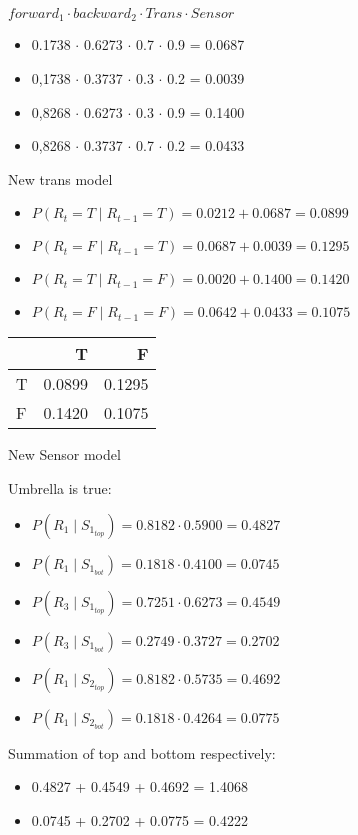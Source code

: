 \documentclass[colorlinks=true,linkcolor=blue]{article}
\begin{document}
$forward_1 \cdot backward_2 \cdot Trans \cdot Sensor$
\begin{itemize}
\item 0.1738 $\cdot$ 0.6273 $\cdot$ 0.7 $\cdot$ 0.9 = 0.0687
\item 0,1738 $\cdot$ 0.3737 $\cdot$ 0.3 $\cdot$ 0.2 = 0.0039
\item 0,8268 $\cdot$ 0.6273 $\cdot$ 0.3 $\cdot$ 0.9 = 0.1400
\item 0,8268 $\cdot$ 0.3737 $\cdot$ 0.7 $\cdot$ 0.2 = 0.0433
\end{itemize}

New trans model
\begin{itemize}
\item $P(R_t = T \mid R_{t-1} = T) = 0.0212 + 0.0687 = 0.0899$
\item $P(R_t = F \mid R_{t-1} = T) = 0.0687 + 0.0039 = 0.1295$
\item $P(R_t = T \mid R_{t-1} = F) = 0.0020 + 0.1400 = 0.1420$
\item $P(R_t = F \mid R_{t-1} = F) = 0.0642 + 0.0433 = 0.1075$
\end{itemize}
\begin{center}
\begin{tabular}{l|rr}
 & T & F\\
\hline
T & 0.0899 & 0.1295\\
F & 0.1420 & 0.1075\\
\end{tabular}
\end{center}

New Sensor model

Umbrella is true:
\begin{itemize}
\item $P(R_1 \mid S_{1_{top}}) = 0.8182 \cdot 0.5900 = 0.4827$
\item $P(R_1 \mid S_{1_{bot}}) = 0.1818 \cdot 0.4100 = 0.0745$
\item $P(R_3 \mid S_{1_{top}}) = 0.7251 \cdot 0.6273 = 0.4549$
\item $P(R_3 \mid S_{1_{bot}}) = 0.2749 \cdot 0.3727 = 0.2702$
\item $P(R_1 \mid S_{2_{top}}) = 0.8182 \cdot 0.5735 = 0.4692$
\item $P(R_1 \mid S_{2_{bot}}) = 0.1818 \cdot 0.4264 = 0.0775$
\end{itemize}

Summation of top and bottom respectively:
\begin{itemize}
\item 0.4827 + 0.4549 + 0.4692 = 1.4068
\item 0.0745 + 0.2702 + 0.0775 = 0.4222
\end{itemize}
\end{document}
